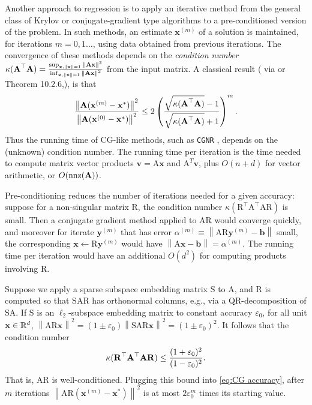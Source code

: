 \documentclass[11pt]{article}
\newcommand{\R}{\ensuremath\mathbb{R}}
\newcommand{\mat}[1]{{\ensuremath{\bm{\mathrm{#1}}}}}
\def\b{{\mathbf b}}
\def\ve{{\mathbf v}}
\def\matA{\mat{A}}
\def\matR{\mat{R}}
\def\matS{\mat{S}}
\def\nnz{{ \rm nnz }}
\def\frac#1#2{{#1\over #2}}
\def\x{{\mathbf x}}
\def\y{{\mathbf y}}
\def\b{{\mathbf b}}
\def\norm#1{{\left\|#1\right\|}}
\newcommand{\eps}{\varepsilon}
\begin{document}
Another approach to regression is to apply an iterative method
from the general class of Krylov or conjugate-gradient type algorithms to a 
pre-conditioned version of the problem. In such methods,
an estimate $\x^{(m)}$ of a solution is maintained,
for iterations $m=0,1\ldots$,
using data obtained from previous iterations.
The convergence of these methods depends
on the \emph{condition number}
$\kappa(\matA^\top \matA)= \frac{\sup_{\x,\norm{\x}=1} \norm{\matA \x}^2}{\inf_{\x,\norm{\x}=1} \norm{\matA \x}^2}$
from the input matrix.
A classical result (\cite{Luen} via \cite{MSM} or Theorem 10.2.6,\cite{GvL}),
is that
\begin{equation}\label{eq:CG accuracy}
\frac{\norm{\matA( \x^{(m)} - \x^*)}^2}{\norm{\matA(\x^{(0)} - \x^*)}^2}
	\le 2\left(\frac{\sqrt{\kappa(\matA^\top \matA)} - 1}{\sqrt{\kappa(\matA^\top \matA)} + 1}\right)^m.
\end{equation}
Thus the running time of CG-like methods, such as {\tt CGNR} \cite{GvL},
depends on the (unknown)
condition number. The running time per iteration is the time needed
to compute matrix vector products $\ve = \matA \x$ and $\matA^T \ve$,
plus $O(n+d)$ for vector arithmetic, or $O(\nnz(\matA))$.

Pre-conditioning reduces the number of iterations needed for a given accuracy:
suppose
for a non-singular matrix $\matR$, the condition number $\kappa(\matR^\top \matA^\top \matA \matR)$
is small. Then a conjugate gradient method applied to $\matA \matR$ would converge quickly,
and moreover for iterate $\y^{(m)}$ that has error $\alpha^{(m)} \equiv \norm{\matA \matR \y^{(m)} - \b}$
small, the corresponding $\x\gets \matR \y^{(m)}$ would have $\norm{\matA \x- \b} = \alpha^{(m)}$.
The running time per iteration would have an
additional $O(d^2)$ for computing products involving $\matR$.

Suppose we apply a sparse subspace embedding matrix $\matS$
to $\matA$, and $\matR$ is computed so that $\matS \matA \matR$  has
orthonormal columns, e.g., via a QR-decomposition of $\matS \matA$. 
If $\matS$ is an $\ell_2$-subspace
embedding matrix to constant accuracy $\eps_0$,
for all unit $\x\in\R^d$,
$\norm{\matA \matR \x}^2=(1\pm\eps_0)\norm{\matS \matA \matR \x}^2= (1\pm \eps_0)^2$.
It follows that the condition number
\[
\kappa(\matR^\top \matA^\top \matA \matR)
	\le \frac{(1+\eps_0)^2}{(1-\eps_0)^2}.
\]
That is, $\matA \matR$ is well-conditioned. Plugging this
bound into \eqref{eq:CG accuracy}, after $m$ iterations
$\norm{\matA \matR(\x^{(m)} - \x^*)}^2$ is at most $2\eps_0^m$
times its starting value.
\end{document}
